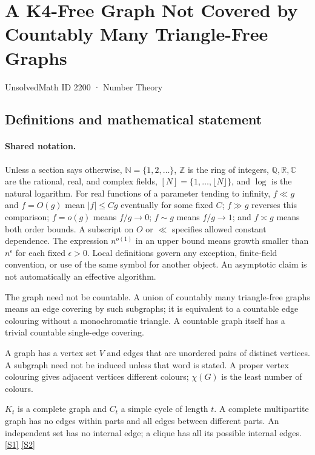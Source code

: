 \documentclass[11pt,a4paper]{article}
\newcommand{\N}{\mathbb{N}}
\newcommand{\Z}{\mathbb{Z}}
\newcommand{\Q}{\mathbb{Q}}
\newcommand{\R}{\mathbb{R}}
\newcommand{\C}{\mathbb{C}}
\newcommand{\sref}[2]{\hyperlink{source:#1:#2}{[S#2]}}
\begin{document}

\setcounter{section}{2199}

\section{A K4-Free Graph Not Covered by Countably Many Triangle-Free Graphs}\label{2200}

{\small\sffamily UnsolvedMath ID 2200 · Number Theory}

\subsection{Definitions and mathematical statement}

\paragraph{Shared notation.}Unless a section says otherwise, $\N=\{1,2,\ldots\}$,
$\Z$ is the ring of integers, $\Q,\R,\C$ are the rational, real, and complex
fields, $[N]=\{1,\ldots,\lfloor N\rfloor\}$, and $\log$ is the natural
logarithm. For real functions of a parameter tending to infinity,
$f\ll g$ and $f=O(g)$ mean $|f|\leq Cg$ eventually for some fixed $C$;
$f\gg g$ reverses this comparison; $f=o(g)$ means $f/g\to0$;
$f\sim g$ means $f/g\to1$; and $f\asymp g$ means both order bounds.
A subscript on $O$ or $\ll$ specifies allowed constant dependence.
The expression $n^{o(1)}$ in an upper bound means growth smaller than
$n^\epsilon$ for each fixed $\epsilon>0$. Local definitions govern any
exception, finite-field convention, or use of the same symbol for another
object. An asymptotic claim is not automatically an effective algorithm.



The graph need not be countable. A union of countably many triangle-free graphs means an edge covering by such subgraphs; it is equivalent to a countable edge colouring without a monochromatic triangle. A countable graph itself has a trivial countable single-edge covering.

A graph has a vertex set $V$ and edges that are unordered pairs of distinct vertices. A subgraph need not be induced unless that word is stated. A proper vertex colouring gives adjacent vertices different colours; $\chi(G)$ is the least number of colours.

$K_t$ is a complete graph and $C_t$ a simple cycle of length $t$. A complete multipartite graph has no edges within parts and all edges between different parts. An independent set has no internal edge; a clique has all its possible internal edges. \sref{2200}{1} \sref{2200}{2}
\end{document}
